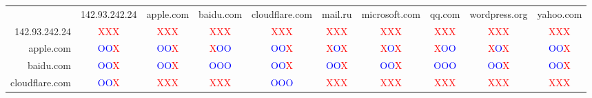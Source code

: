 \documentclass{article}
\begin{document}
\begin{landscape}
\begin{center}
\begin{tabular}{ r|c|c|c|c|c|c|c|c|c }
 \hline

 & 142.93.242.24 & apple.com & baidu.com & cloudflare.com & mail.ru & microsoft.com & qq.com & wordpress.org & yahoo.com    \\
142.93.242.24   & \textcolor{red}{X}\textcolor{red}{X}\textcolor{red}{X} & \textcolor{red}{X}\textcolor{red}{X}\textcolor{red}{X} & \textcolor{red}{X}\textcolor{red}{X}\textcolor{red}{X} & \textcolor{red}{X}\textcolor{red}{X}\textcolor{red}{X} & \textcolor{red}{X}\textcolor{red}{X}\textcolor{red}{X} & \textcolor{red}{X}\textcolor{red}{X}\textcolor{red}{X} & \textcolor{red}{X}\textcolor{red}{X}\textcolor{red}{X} & \textcolor{red}{X}\textcolor{red}{X}\textcolor{red}{X} & \textcolor{red}{X}\textcolor{red}{X}\textcolor{red}{X} \\
apple.com   & \textcolor{blue}{O}\textcolor{blue}{O}\textcolor{red}{X} & \textcolor{blue}{O}\textcolor{blue}{O}\textcolor{red}{X} & \textcolor{red}{X}\textcolor{blue}{O}\textcolor{blue}{O} & \textcolor{blue}{O}\textcolor{blue}{O}\textcolor{red}{X} & \textcolor{red}{X}\textcolor{blue}{O}\textcolor{red}{X} & \textcolor{red}{X}\textcolor{blue}{O}\textcolor{red}{X} & \textcolor{red}{X}\textcolor{blue}{O}\textcolor{blue}{O} & \textcolor{red}{X}\textcolor{blue}{O}\textcolor{red}{X} & \textcolor{blue}{O}\textcolor{blue}{O}\textcolor{red}{X} \\
baidu.com   & \textcolor{blue}{O}\textcolor{blue}{O}\textcolor{red}{X} & \textcolor{blue}{O}\textcolor{blue}{O}\textcolor{red}{X} & \textcolor{blue}{O}\textcolor{blue}{O}\textcolor{blue}{O} & \textcolor{blue}{O}\textcolor{blue}{O}\textcolor{red}{X} & \textcolor{blue}{O}\textcolor{blue}{O}\textcolor{red}{X} & \textcolor{blue}{O}\textcolor{blue}{O}\textcolor{red}{X} & \textcolor{blue}{O}\textcolor{blue}{O}\textcolor{blue}{O} & \textcolor{blue}{O}\textcolor{blue}{O}\textcolor{red}{X} & \textcolor{blue}{O}\textcolor{blue}{O}\textcolor{red}{X} \\
cloudflare.com   & \textcolor{blue}{O}\textcolor{blue}{O}\textcolor{red}{X} & \textcolor{red}{X}\textcolor{red}{X}\textcolor{red}{X} & \textcolor{red}{X}\textcolor{red}{X}\textcolor{red}{X} & \textcolor{blue}{O}\textcolor{blue}{O}\textcolor{blue}{O} & \textcolor{red}{X}\textcolor{red}{X}\textcolor{red}{X} & \textcolor{red}{X}\textcolor{red}{X}\textcolor{red}{X} & \textcolor{red}{X}\textcolor{red}{X}\textcolor{red}{X} & \textcolor{red}{X}\textcolor{red}{X}\textcolor{red}{X} & \textcolor{red}{X}\textcolor{red}{X}\textcolor{red}{X} \\

\end{tabular}
\end{center}
\end{landscape}
\end{document}
